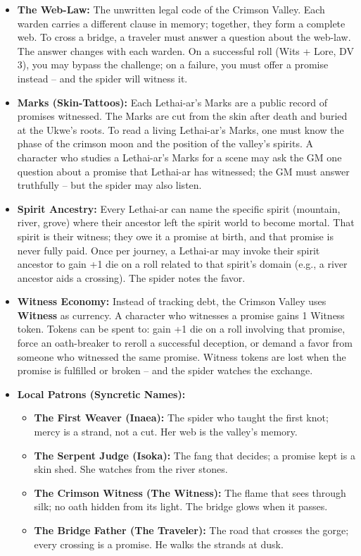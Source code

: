 \begin{itemize}
\item \textbf{The Web-Law:} The unwritten legal code of the Crimson Valley. Each warden carries a different clause in memory; together, they form a complete web. To cross a bridge, a traveler must answer a question about the web-law. The answer changes with each warden. On a successful roll (Wits + Lore, DV 3), you may bypass the challenge; on a failure, you must offer a promise instead -- and the spider will witness it.
\item \textbf{Marks (Skin-Tattoos):} Each Lethai-ar's Marks are a public record of promises witnessed. The Marks are cut from the skin after death and buried at the Ukwe's roots. To read a living Lethai-ar's Marks, one must know the phase of the crimson moon and the position of the valley's spirits. A character who studies a Lethai-ar's Marks for a scene may ask the GM one question about a promise that Lethai-ar has witnessed; the GM must answer truthfully -- but the spider may also listen.
\item \textbf{Spirit Ancestry:} Every Lethai-ar can name the specific spirit (mountain, river, grove) where their ancestor left the spirit world to become mortal. That spirit is their witness; they owe it a promise at birth, and that promise is never fully paid. Once per journey, a Lethai-ar may invoke their spirit ancestor to gain +1 die on a roll related to that spirit's domain (e.g., a river ancestor aids a crossing). The spider notes the favor.
\item \textbf{Witness Economy:} Instead of tracking debt, the Crimson Valley uses \textbf{Witness} as currency. A character who witnesses a promise gains 1 Witness token. Tokens can be spent to: gain +1 die on a roll involving that promise, force an oath-breaker to reroll a successful deception, or demand a favor from someone who witnessed the same promise. Witness tokens are lost when the promise is fulfilled or broken -- and the spider watches the exchange.
\item \textbf{Local Patrons (Syncretic Names):}
  \begin{itemize}
    \item \textbf{The First Weaver (Inaea):} The spider who taught the first knot; mercy is a strand, not a cut. Her web is the valley's memory.
    \item \textbf{The Serpent Judge (Isoka):} The fang that decides; a promise kept is a skin shed. She watches from the river stones.
    \item \textbf{The Crimson Witness (The Witness):} The flame that sees through silk; no oath hidden from its light. The bridge glows when it passes.
    \item \textbf{The Bridge Father (The Traveler):} The road that crosses the gorge; every crossing is a promise. He walks the strands at dusk.
  \end{itemize}
\end{itemize}

